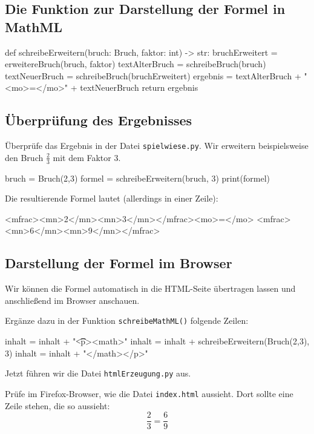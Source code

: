 \subsection*{Die Funktion zur Darstellung der Formel in MathML}

\begin{codePython}
def schreibeErweitern(bruch: Bruch, faktor: int) -> str:
	bruchErweitert = erweitereBruch(bruch, faktor)
	textAlterBruch = schreibeBruch(bruch)
	textNeuerBruch = schreibeBruch(bruchErweitert)
	ergebnis = textAlterBruch + "<mo>=</mo>" + textNeuerBruch
	return ergebnis
\end{codePython}

\subsection*{Überprüfung des Ergebnisses}

Überprüfe das Ergebnis in der Datei \texttt{spielwiese.py}. Wir erweitern beispielsweise den Bruch $\frac{2}{3}$ mit dem Faktor 3.

\begin{codePython}
bruch = Bruch(2,3)
formel = schreibeErweitern(bruch, 3)
print(formel)
\end{codePython}

Die resultierende Formel lautet (allerdings in einer Zeile):

\begin{codeHTML}
<mfrac><mn>2</mn><mn>3</mn></mfrac><mo>=</mo>
									<mfrac><mn>6</mn><mn>9</mn></mfrac>
\end{codeHTML}

\subsection*{Darstellung der Formel im Browser}

Wir können die Formel automatisch in die HTML-Seite übertragen lassen und anschließend im Browser anschauen.

Ergänze dazu in der Funktion \texttt{schreibeMathML()} folgende Zeilen:

\begin{codePython}
inhalt = inhalt + "\n\t\t<p><math>"
inhalt = inhalt + schreibeErweitern(Bruch(2,3), 3)
inhalt = inhalt + "</math></p>"
\end{codePython}

Jetzt führen wir die Datei \texttt{htmlErzeugung.py} aus.

Prüfe im Firefox-Browser, wie die Datei \texttt{index.html} aussieht. Dort sollte eine Zeile stehen, die so aussieht:
\[
\frac{2}{3} = \frac{6}{9}
\]